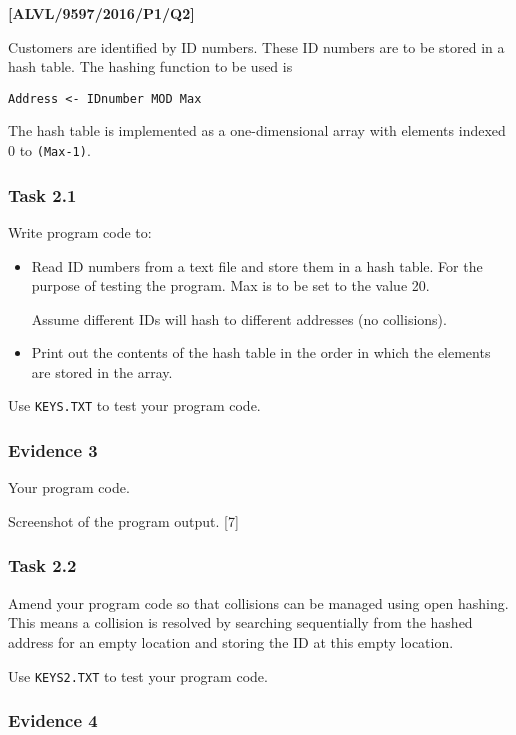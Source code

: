 \item \textbf{{[}ALVL/9597/2016/P1/Q2{]} }

Customers are identified by ID numbers. These ID numbers are to be
stored in a hash table. The hashing function to be used is 
\begin{center}
\texttt{Address <- IDnumber MOD Max }
\par\end{center}

The hash table is implemented as a one-dimensional array with elements
indexed 0 to \texttt{(Max-1)}. 

\subsubsection*{Task 2.1}

Write program code to: 
\begin{itemize}
\item Read ID numbers from a text file and store them in a hash table. For
the purpose of testing the program. Max is to be set to the value
20. 

Assume different IDs will hash to different addresses (no collisions). 
\item Print out the contents of the hash table in the order in which the
elements are stored in the array.
\end{itemize}
Use \texttt{KEYS.TXT} to test your program code.

\subsubsection*{Evidence 3}

Your program code. 

Screenshot of the program output.\hfill{} {[}7{]}

\subsubsection*{Task 2.2}

Amend your program code so that collisions can be managed using open
hashing. This means a collision is resolved by searching sequentially
from the hashed address for an empty location and storing the ID at
this empty location. 

Use \texttt{KEYS2.TXT} to test your program code. 

\subsubsection*{Evidence 4}


